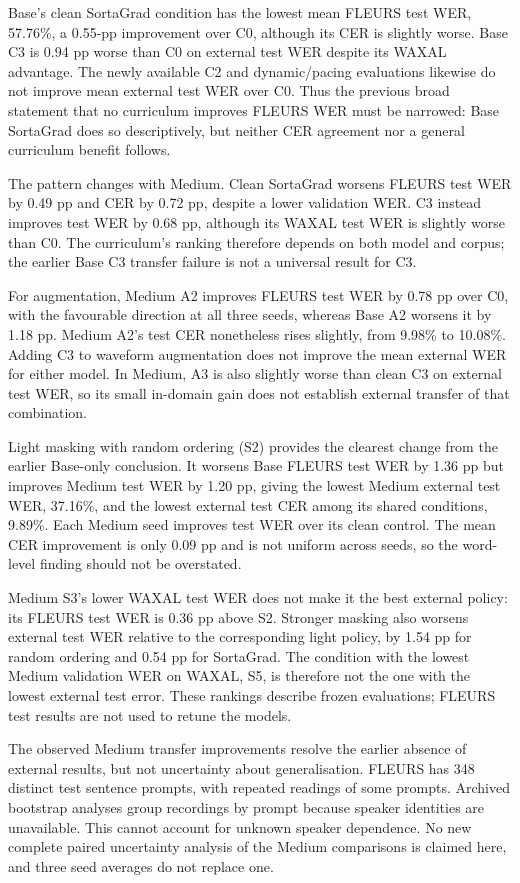 \documentclass[12pt,a4paper]{report}
\begin{document}
Base's clean SortaGrad condition has the lowest mean FLEURS test WER,
57.76\%, a 0.55-pp improvement over C0, although its CER is slightly worse.
Base C3 is 0.94 pp worse than C0 on external test WER despite its WAXAL
advantage. The newly available C2 and dynamic/pacing evaluations likewise
do not improve mean external test WER over C0. Thus the previous broad
statement that no curriculum improves FLEURS WER must be narrowed: Base
SortaGrad does so descriptively, but neither CER agreement nor a general
curriculum benefit follows.

The pattern changes with Medium. Clean SortaGrad worsens FLEURS test WER
by 0.49 pp and CER by 0.72 pp, despite a lower validation WER. C3 instead
improves test WER by 0.68 pp, although its WAXAL test WER is slightly worse
than C0. The curriculum's ranking therefore depends on both model and corpus;
the earlier Base C3 transfer failure is not a universal result for C3.

For augmentation, Medium A2 improves FLEURS test WER by 0.78 pp over C0,
with the favourable direction at all three seeds, whereas Base A2 worsens
it by 1.18 pp. Medium A2's test CER nonetheless rises slightly, from 9.98\%
to 10.08\%. Adding C3 to waveform augmentation does not improve the mean
external WER for either model. In Medium, A3 is also slightly worse than
clean C3 on external test WER, so its small in-domain gain does not establish
external transfer of that combination.

Light masking with random ordering (S2) provides the clearest change from
the earlier Base-only conclusion. It worsens Base FLEURS test WER by
1.36 pp but improves Medium test WER by 1.20 pp, giving the lowest Medium
external test WER, 37.16\%, and the lowest external test CER among its
shared conditions, 9.89\%. Each Medium seed improves test WER over its
clean control. The mean CER improvement is only 0.09 pp and is not uniform
across seeds, so the word-level finding should not be overstated.

Medium S3's lower WAXAL test WER does not make it the best external policy:
its FLEURS test WER is 0.36 pp above S2. Stronger masking also worsens
external test WER relative to the corresponding light policy, by 1.54 pp
for random ordering and 0.54 pp for SortaGrad. The condition with the lowest
Medium validation WER on WAXAL, S5, is therefore not the one with the
lowest external test error. These rankings describe frozen evaluations;
FLEURS test results are not used to retune the models.

The observed Medium transfer improvements resolve the earlier absence of
external results, but not uncertainty about generalisation. FLEURS has 348
distinct test sentence prompts, with repeated readings of some prompts.
Archived bootstrap analyses group recordings by prompt because speaker
identities are unavailable. This cannot account for unknown speaker dependence.
No new complete paired uncertainty analysis of the Medium comparisons is
claimed here, and three seed averages do not replace one.
\end{document}
